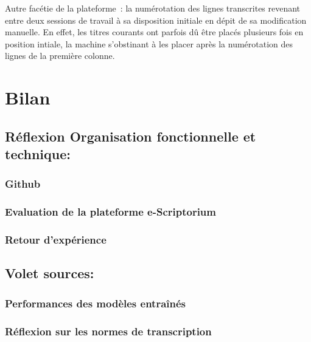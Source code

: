 \documentclass{article}
\begin{document}
	Autre facétie de la plateforme~: la numérotation des lignes transcrites revenant entre deux sessions de travail à sa disposition initiale en dépit de sa modification manuelle. En effet, les titres courants ont parfois dû être placés plusieurs fois en position intiale, la machine s'obstinant à les placer après la numérotation des lignes de la première colonne.
	
	\section{Bilan}
	
	\subsection{Réflexion Organisation fonctionnelle et technique:}
	\subsubsection{Github}
	\subsubsection{Evaluation de la plateforme e-Scriptorium}
	\subsubsection{Retour d'expérience}
	\subsection{Volet sources:}
	\subsubsection{Performances des modèles entraînés}
	\subsubsection{Réflexion sur les normes de transcription}
	
	\printbibheading
	
	\printbibliography[heading=subbibliography,title=Projets et ressources,keyword=projets]
	
	\printbibliography[heading=subbibliography,title=Notices,keyword=notices]
	
	\printbibliography[heading=subbibliography,title=Études,keyword=autres]
	
\end{document}
